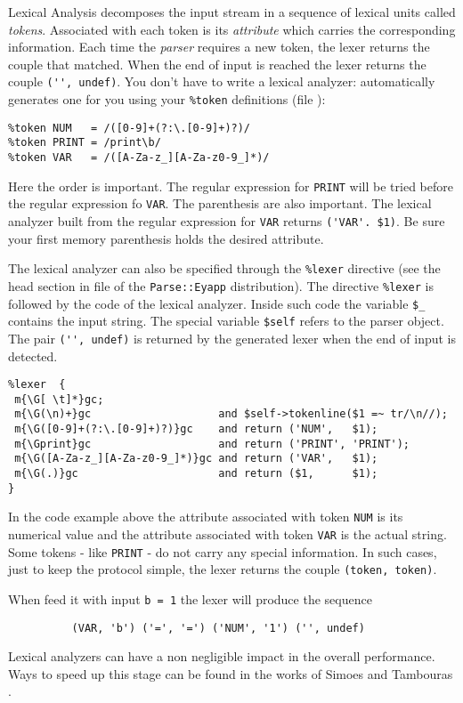 Lexical Analysis decomposes the input stream in a 
sequence of lexical units called \emph{tokens}.
Associated with each token is its \emph{attribute}
which carries the corresponding information.
Each time the \emph{parser}
requires a new token, the lexer returns
the couple  that matched.
When the end of input is reached the lexer
returns the couple \verb|('', undef)|.
You don't have to write a lexical analyzer:
 automatically generates one
for you using your \verb|%token| definitions
(file ):


\begin{verbatim}
%token NUM   = /([0-9]+(?:\.[0-9]+)?)/
%token PRINT = /print\b/
%token VAR   = /([A-Za-z_][A-Za-z0-9_]*)/
\end{verbatim}

Here the order is important. The regular expression
for \verb|PRINT| will be tried before the regular expression
fo \verb|VAR|. The parenthesis are also important. The 
lexical analyzer built from the regular expression 
for \verb|VAR| returns \verb|('VAR'. $1)|. Be sure your first memory
parenthesis holds the desired attribute.

The lexical analyzer can also be specified
through the \verb|%lexer| directive (see
the head section in file  of the 
\verb|Parse::Eyapp| distribution).
The directive \verb|%lexer| is followed by the code of the lexical analyzer.
Inside such code the variable \verb|$_| contains the input string. The special
variable \verb|$self| refers to the parser object. The pair \verb|('', undef)|
is returned by the generated lexer when the end of input is detected.

\begin{verbatim}
%lexer  {
 m{\G[ \t]*}gc;
 m{\G(\n)+}gc                    and $self->tokenline($1 =~ tr/\n//);
 m{\G([0-9]+(?:\.[0-9]+)?)}gc    and return ('NUM',   $1);
 m{\Gprint}gc                    and return ('PRINT', 'PRINT');
 m{\G([A-Za-z_][A-Za-z0-9_]*)}gc and return ('VAR',   $1);
 m{\G(.)}gc                      and return ($1,      $1);
}
\end{verbatim}
In the code example above
the attribute associated with token \verb|NUM|
is its numerical value and the attribute associated with 
token \verb|VAR| is the actual string.
Some tokens - like \verb|PRINT| -  do not carry any special
information. In such cases, just to keep the protocol
simple, the lexer returns the couple \verb|(token, token)|.


When feed it with input \verb|b = 1| the lexer
will produce the sequence 

\begin{verbatim}
          (VAR, 'b') ('=', '=') ('NUM', '1') ('', undef)
\end{verbatim}

Lexical analyzers can have a non negligible impact in 
the overall performance. Ways to speed up this stage can be found 
in the works of Simoes \cite{simoes} and Tambouras \cite{Tambouras}.
